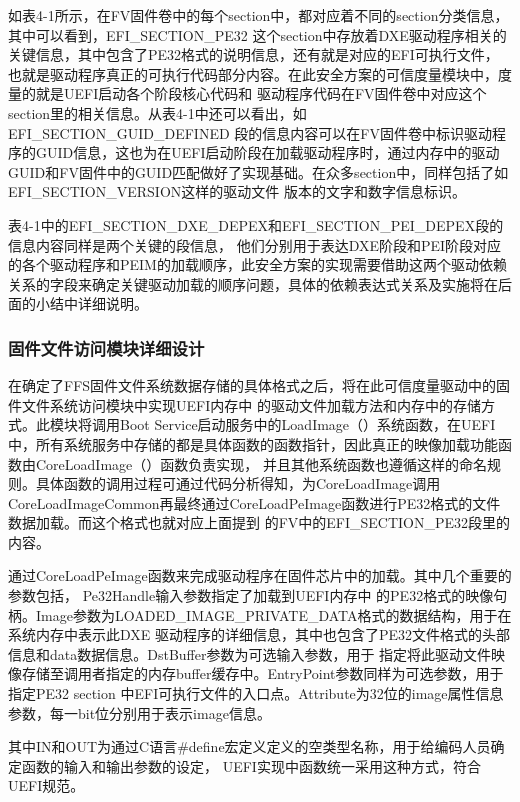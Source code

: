 如表4-1所示，在FV固件卷中的每个section中，都对应着不同的section分类信息，其中可以看到，EFI\_SECTION\_PE32
这个section中存放着DXE驱动程序相关的关键信息，其中包含了PE32格式的说明信息，还有就是对应的EFI可执行文件，
也就是驱动程序真正的可执行代码部分内容。在此安全方案的可信度量模块中，度量的就是UEFI启动各个阶段核心代码和
驱动程序代码在FV固件卷中对应这个section里的相关信息。从表4-1中还可以看出，如EFI\_SECTION\_GUID\_DEFINED
段的信息内容可以在FV固件卷中标识驱动程序的GUID信息，这也为在UEFI启动阶段在加载驱动程序时，通过内存中的驱动
GUID和FV固件中的GUID匹配做好了实现基础。在众多section中，同样包括了如EFI\_SECTION\_VERSION这样的驱动文件
版本的文字和数字信息标识。
\par 表4-1中的EFI\_SECTION\_DXE\_DEPEX和EFI\_SECTION\_PEI\_DEPEX段的信息内容同样是两个关键的段信息，
他们分别用于表达DXE阶段和PEI阶段对应的各个驱动程序和PEIM的加载顺序，此安全方案的实现需要借助这两个驱动依赖
关系的字段来确定关键驱动加载的顺序问题，具体的依赖表达式关系及实施将在后面的小结中详细说明。

\subsubsection{固件文件访问模块详细设计}
在确定了FFS固件文件系统数据存储的具体格式之后，将在此可信度量驱动中的固件文件系统访问模块中实现UEFI内存中
的驱动文件加载方法和内存中的存储方式。此模块将调用Boot Service启动服务中的LoadImage（）系统函数，在UEFI
中，所有系统服务中存储的都是具体函数的函数指针，因此真正的映像加载功能函数由CoreLoadImage（）函数负责实现，
并且其他系统函数也遵循这样的命名规则。具体函数的调用过程可通过代码分析得知，为CoreLoadImage调用
CoreLoadImageCommon再最终通过CoreLoadPeImage函数进行PE32格式的文件数据加载。而这个格式也就对应上面提到
的FV中的EFI\_SECTION\_PE32段里的内容。
\par 通过CoreLoadPeImage函数来完成驱动程序在固件芯片中的加载。其中几个重要的参数包括，
Pe32Handle输入参数指定了加载到UEFI内存中
的PE32格式的映像句柄。Image参数为LOADED\_IMAGE\_PRIVATE\_DATA格式的数据结构，用于在系统内存中表示此DXE
驱动程序的详细信息，其中也包含了PE32文件格式的头部信息和data数据信息。DstBuffer参数为可选输入参数，用于
指定将此驱动文件映像存储至调用者指定的内存buffer缓存中。EntryPoint参数同样为可选参数，用于指定PE32 section
中EFI可执行文件的入口点。Attribute为32位的image属性信息参数，每一bit位分别用于表示image信息。
\par 其中IN和OUT为通过C语言\#define宏定义定义的空类型名称，用于给编码人员确定函数的输入和输出参数的设定，
UEFI实现中函数统一采用这种方式，符合UEFI规范。

